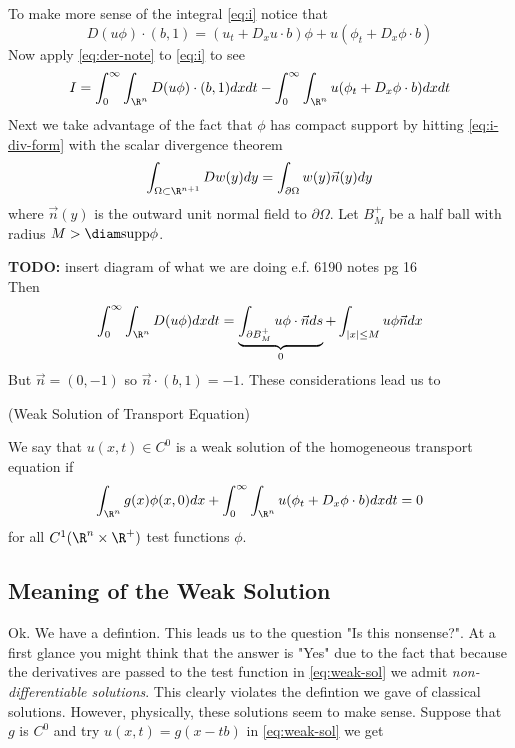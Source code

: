 \documentclass{bkcnotes}
\newcommand{\todo}[1]{{\bf TODO: } #1\\}
\begin{document}
To make more sense of the integral \eqref{eq:i} notice that
\begin{equation}
  \label{eq:der-note}
  D(u\phi)\cdot (b,1) = (u_t + D_xu\cdot b)\phi + u(\phi_t + D_x\phi\cdot b)
\end{equation}
Now apply \eqref{eq:der-note} to \eqref{eq:i} to see
\begin{equation}
  \label{eq:i-div-form}
  I = \int_0^\infty\int_{\R^n} D(u\phi)\cdot (b,1)dxdt 
  - \int_0^\infty\int_{\R^n} u(\phi_t + D_x\phi\cdot b)dxdt
\end{equation}
Next we take advantage of the fact that $\phi$ has compact support by
hitting \eqref{eq:i-div-form} with the scalar divergence theorem
\begin{equation}
  \label{eq:scalar-div-thm}
  \int_{\Omega \subset \R^{n+1}} Dw(y)dy = \int_{\partial \Omega}w(y)\vec{n}(y)dy
\end{equation}
where $\vec{n}(y)$ is the outward unit normal field to $\partial
\Omega$. Let $B_M^+$ be a half ball with radius $M > \diam \text{supp}
\phi$.

\todo{insert diagram of what we are doing e.f. 6190 notes pg 16}

Then
\begin{equation}
  \int_0^\infty \int_{\R^n} D(u\phi)dxdt =
  \underbrace{\int_{\partial B_M^+} u\phi\cdot \vec{n}ds}_{0} +
  \int_{|x|\leq M} u\phi \vec{n}dx
\end{equation}
But $\vec{n} = (0,-1)$ so $\vec{n} \cdot (b,1) = -1$. These
considerations lead us to

\begin{ndefn}(Weak Solution of Transport Equation)
  
  We say that $u(x,t) \in C^0$ is a weak solution of the homogeneous
  transport equation if
  \begin{equation}
    \label{eq:weak-sol}
    \int_{\R^n} g(x)\phi(x,0)dx +
    \int_0^\infty\int_{\R^n} u(\phi_t +
    D_x\phi\cdot b)dxdt =
    0
  \end{equation}
  for all $C^1(\R^n \times\R^+)$ test functions $\phi$.
\end{ndefn}

\subsection{Meaning of the Weak Solution}
Ok. We have a defintion. This leads us to the question "Is this
nonsense?". At a first glance you might think that the answer is "Yes"
due to the fact that because the derivatives are passed to the test
function in \eqref{eq:weak-sol} we admit \emph{non-differentiable
  solutions}. This clearly violates the defintion we gave of classical
solutions. However, physically, these solutions seem to make
sense. Suppose that $g$ is $C^0$ and try $u(x,t) = g(x-tb)$ in
\eqref{eq:weak-sol} we get
\end{document}
